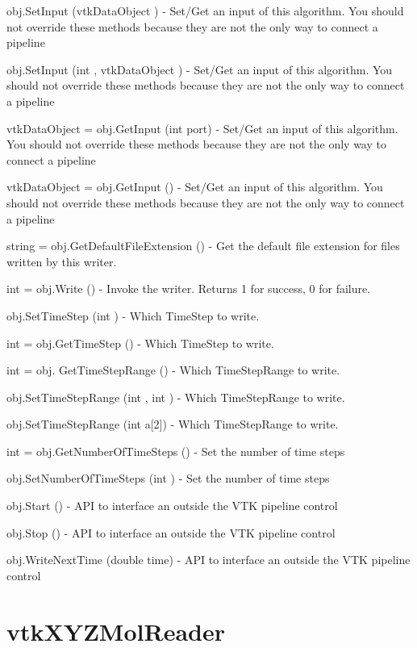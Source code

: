 \begin{DoxyItemize}
\item {\ttfamily obj.\-Set\-Input (vtk\-Data\-Object )} -\/ Set/\-Get an input of this algorithm. You should not override these methods because they are not the only way to connect a pipeline  
\item {\ttfamily obj.\-Set\-Input (int , vtk\-Data\-Object )} -\/ Set/\-Get an input of this algorithm. You should not override these methods because they are not the only way to connect a pipeline  
\item {\ttfamily vtk\-Data\-Object = obj.\-Get\-Input (int port)} -\/ Set/\-Get an input of this algorithm. You should not override these methods because they are not the only way to connect a pipeline  
\item {\ttfamily vtk\-Data\-Object = obj.\-Get\-Input ()} -\/ Set/\-Get an input of this algorithm. You should not override these methods because they are not the only way to connect a pipeline  
\item {\ttfamily string = obj.\-Get\-Default\-File\-Extension ()} -\/ Get the default file extension for files written by this writer.  
\item {\ttfamily int = obj.\-Write ()} -\/ Invoke the writer. Returns 1 for success, 0 for failure.  
\item {\ttfamily obj.\-Set\-Time\-Step (int )} -\/ Which Time\-Step to write.  
\item {\ttfamily int = obj.\-Get\-Time\-Step ()} -\/ Which Time\-Step to write.  
\item {\ttfamily int = obj. Get\-Time\-Step\-Range ()} -\/ Which Time\-Step\-Range to write.  
\item {\ttfamily obj.\-Set\-Time\-Step\-Range (int , int )} -\/ Which Time\-Step\-Range to write.  
\item {\ttfamily obj.\-Set\-Time\-Step\-Range (int a\mbox{[}2\mbox{]})} -\/ Which Time\-Step\-Range to write.  
\item {\ttfamily int = obj.\-Get\-Number\-Of\-Time\-Steps ()} -\/ Set the number of time steps  
\item {\ttfamily obj.\-Set\-Number\-Of\-Time\-Steps (int )} -\/ Set the number of time steps  
\item {\ttfamily obj.\-Start ()} -\/ A\-P\-I to interface an outside the V\-T\-K pipeline control  
\item {\ttfamily obj.\-Stop ()} -\/ A\-P\-I to interface an outside the V\-T\-K pipeline control  
\item {\ttfamily obj.\-Write\-Next\-Time (double time)} -\/ A\-P\-I to interface an outside the V\-T\-K pipeline control  
\end{DoxyItemize}\hypertarget{vtkio_vtkxyzmolreader}{}\section{vtk\-X\-Y\-Z\-Mol\-Reader}\label{vtkio_vtkxyzmolreader}
